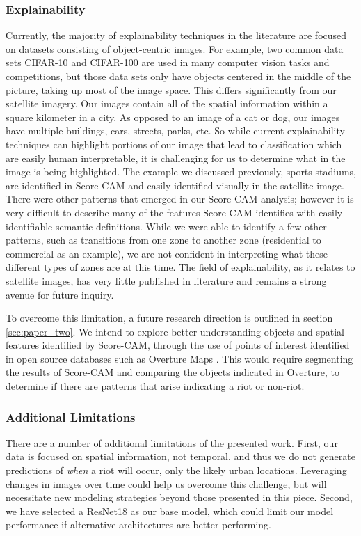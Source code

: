 \subsubsection{Explainability}\label{sec:explainability}
Currently, the majority of explainability techniques in the literature are focused on datasets consisting of object-centric images.  For example, two common data sets CIFAR-10 and CIFAR-100 \citep{cifar10_100} are used in many computer vision tasks and competitions, but those data sets only have objects centered in the middle of the picture, taking up most of the image space.  This differs significantly from our satellite imagery.  Our images contain all of the spatial information within a square kilometer in a city.  As opposed to an image of a cat or dog, our images have multiple buildings, cars, streets, parks, etc.  So while current explainability techniques can highlight portions of our image that lead to classification which are easily human interpretable, it is challenging for us to determine what in the image is being highlighted.  The example we discussed previously, sports stadiums, are identified in Score-CAM and easily identified visually in the satellite image.  There were other patterns that emerged in our Score-CAM analysis; however it is very difficult to describe many of the features Score-CAM identifies with easily identifiable semantic definitions. While we were able to identify a few other patterns, such as transitions from one zone to another zone (residential to commercial as an example), we are not confident in interpreting what these different types of zones are at this time.  The field of explainability, as it relates to satellite images, has very little published in literature and remains a strong avenue for future inquiry.

To overcome this limitation, a future research direction is outlined in section \ref{sec:paper_two}.  We intend to explore better understanding objects and spatial features identified by Score-CAM, through the use of points of interest identified in open source databases such as Overture Maps \citep{OvertureMapsFoundation2023}.  This would require segmenting the results of Score-CAM and comparing the objects indicated in Overture, to determine if there are patterns that arise indicating a riot or non-riot.  

\subsubsection{Additional Limitations}
There are a number of additional limitations of the presented work. 
 First, our data is focused on spatial information, not temporal, and thus we do not generate predictions of \textit{when} a riot will occur, only the likely urban locations.  Leveraging changes in images over time could help us overcome this challenge, but will necessitate new modeling strategies beyond those presented in this piece. Second, we have selected a ResNet18 as our base model, which could limit our model performance if alternative architectures are better performing. 


